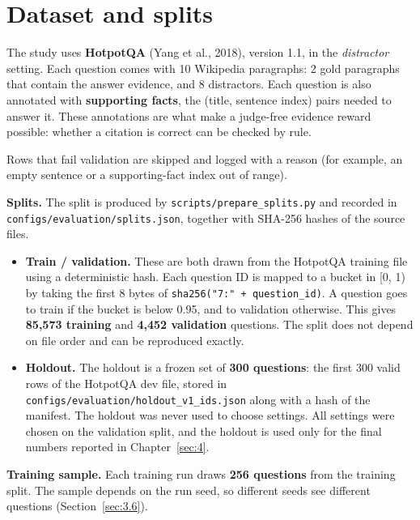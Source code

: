\section{Dataset and splits}\label{sec:3.2}

The study uses \textbf{HotpotQA} (Yang et al., 2018), version 1.1, in
the \emph{distractor} setting. Each question comes with 10 Wikipedia
paragraphs: 2 gold paragraphs that contain the answer evidence, and 8
distractors. Each question is also annotated with \textbf{supporting
facts}, the (title, sentence index) pairs needed to answer it. These
annotations are what make a judge-free evidence reward possible: whether
a citation is correct can be checked by rule.

Rows that fail validation are skipped and logged with a reason (for
example, an empty sentence or a supporting-fact index out of range).

\textbf{Splits.} The split is produced by
\texttt{scripts/\allowbreak{}prepare\_\allowbreak{}splits.\allowbreak{}py}
and recorded in
\texttt{configs/\allowbreak{}evaluation/\allowbreak{}splits.\allowbreak{}json},
together with SHA-256 hashes of the source files.

\begin{itemize}
\tightlist
\item
  \textbf{Train / validation.} These are both drawn from the HotpotQA
  training file using a deterministic hash. Each question ID is mapped
  to a bucket in {[}0, 1) by taking the first 8 bytes of
  \texttt{sha256("7:" + question\_\allowbreak{}id)}. A question goes to
  train if the bucket is below 0.95, and to validation otherwise. This
  gives \textbf{85,573 training} and \textbf{4,452 validation}
  questions. The split does not depend on file order and can be
  reproduced exactly.
\item
  \textbf{Holdout.} The holdout is a frozen set of \textbf{300
  questions}: the first 300 valid rows of the HotpotQA dev file, stored
  in
  \texttt{configs/\allowbreak{}evaluation/\allowbreak{}holdout\_\allowbreak{}v1\_\allowbreak{}ids.\allowbreak{}json}
  along with a hash of the manifest. The holdout was never used to
  choose settings. All settings were chosen on the validation split, and
  the holdout is used only for the final numbers reported in
  Chapter~\ref{sec:4}.
\end{itemize}

\textbf{Training sample.} Each training run draws \textbf{256 questions}
from the training split. The sample depends on the run seed, so
different seeds see different questions (Section~\ref{sec:3.6}).

